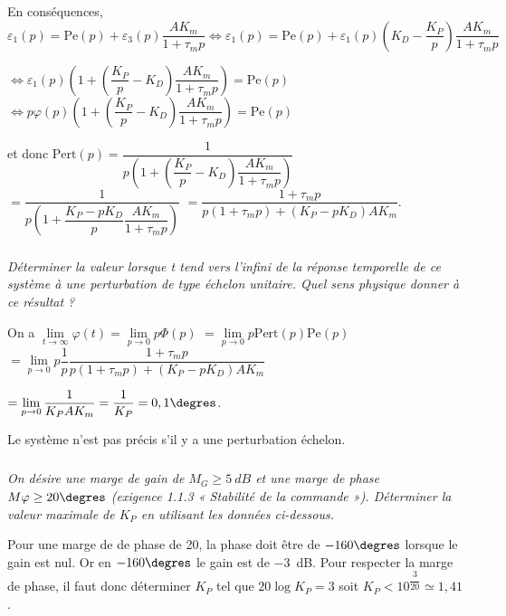 \begin{multicols}{2}
\begin{corrige}
En conséquences, $\varepsilon_1(p)=\text{Pe}(p)+\varepsilon_3(p)\dfrac{AK_m}{1+\tau_m p} \Longleftrightarrow 
\varepsilon_1(p)=\text{Pe}(p)+\varepsilon_1(p)\left(K_D-\dfrac{K_P}{p} \right)\dfrac{AK_m}{1+\tau_m p}$

$ \Leftrightarrow 
\varepsilon_1(p)\left( 1+\left(\dfrac{K_P}{p}-K_D \right)\dfrac{AK_m}{1+\tau_m p}\right)=\text{Pe}(p)$
$ \Leftrightarrow 
p\varphi(p)\left( 1+\left(\dfrac{K_P}{p}-K_D \right)\dfrac{AK_m}{1+\tau_m p}\right)=\text{Pe}(p)$

et donc $\text{Pert}(p)=\dfrac{1}{p\left( 1+\left(\dfrac{K_P}{p}-K_D \right)\dfrac{AK_m}{1+\tau_m p}\right)}$
$=\dfrac{1}{p\left( 1+\dfrac{K_P-pK_D}{p}\dfrac{AK_m}{1+\tau_m p}\right)}$
$=\dfrac{1+\tau_m p}{p \left(1+\tau_m p\right)+\left(K_P-pK_D\right)AK_m}$.



\end{corrige}
\else
\fi



\subparagraph{}
\textit{Déterminer la valeur lorsque t tend vers l’infini de la réponse temporelle de ce système à une
perturbation de type échelon unitaire. Quel sens physique donner à ce résultat ?}
\ifprof
\begin{corrige}
On a $\lim\limits_{t\to\infty}\varphi(t) = \lim\limits_{p\to 0}p\Phi(p)$ 
$=\lim\limits_{p\to 0}p\text{Pert}(p)\text{Pe}(p)$
  $= \lim\limits_{p\to 0}p\dfrac{1}{p} \dfrac{1+\tau_m p}{p \left(1+\tau_m p\right)+\left(K_P-pK_D\right)AK_m}$
  
  $= \lim\limits_{p\to 0}\dfrac{1}{K_PAK_m} =\dfrac{1}{K_P}=0,1\degres$.
  
Le système n'est pas précis s'il y a une perturbation échelon. 
\end{corrige}
\else
\fi

\subparagraph{}
\textit{On désire une marge de gain de $M_G \geq \SI{5}{dB}$ et une marge de phase $M\varphi \geq 20\degres$ (exigence 1.1.3 « Stabilité de la commande »). Déterminer la valeur maximale de $K_P$ en utilisant les données ci-dessous.}




\ifprof
\begin{corrige}
Pour une marge  de de phase de 20\degres, la phase doit être de $-160\degres$ lorsque le gain est nul. Or en $-160\degres$ le gain est de \SI{-3}{dB}. Pour respecter la marge de phase, il faut donc déterminer $K_P$ tel que $20\log K_P = 3$ soit $K_P < 10^{\dfrac{3}{20}}\simeq1,41 $.


\end{corrige}
\end{multicols}
